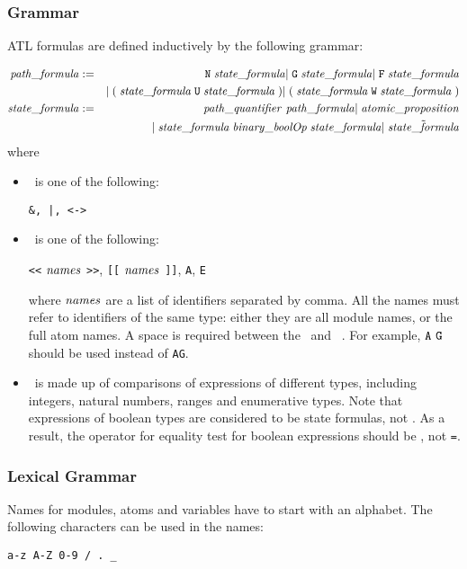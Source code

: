 \subsubsection{Grammar}
\label{sec:ATL-grammar}
ATL formulas are defined inductively by the following grammar:

\begin{eqnarray*}
{\it path\_formula} &:=& {\tt N}\;{\it state\_formula} 
                {\tt |}\; {\tt G}\; {\it state\_formula} 
                {\tt |}\; {\tt F}\; {\it state\_formula} \\
& &             {\tt |}\; {\tt (}\;{\it state\_formula}\;{\tt U}\;{\it state\_formula}\;{\tt )}
                {\tt |}\; {\tt (}\;{\it state\_formula}\;{\tt W}\;{\it state\_formula}\;{\tt )} \\
{\it state\_formula} &:=& {\it path\_quantifier}\ {\it path\_formula} 
                 {\tt |}\; {\it atomic\_proposition} \\
& &              {\tt |}\; {\it state\_formula}\;{\it binary\_boolOp}\;{\it state\_formula}
                 {\tt |}\; \tilde{{\it state\_formula}}
\end{eqnarray*}
where 
\begin{itemize}
\item
\binaryBoolOp\  is one of the following:
\begin{center}
\begin{verbatim}
&, |, <->
\end{verbatim}
\end{center}

\item
\pathQuantifier\  is one of the following:
\begin{center}
{\tt <<} ${\it names}$ {\tt >>}, {\tt [[} ${\it names}$ {\tt ]]}, {\tt A}, {\tt E}
\end{center}
where ${\it names}$ are a list of identifiers separated by comma. All the
names must refer to identifiers of the same type: either they
are all module names, or the full atom names.  A space is required 
between the \pathQuantifier\ and \pathFormula\ . For example, 
${\tt A}\ {\tt G}$ should be used instead of {\tt AG}.

\item
\atomicProp\ is made up of comparisons of expressions of different
types, including integers, natural numbers, ranges and enumerative
types. Note that expressions of boolean types are considered to be
state formulas, not \atomicProp. As a result, the operator for
equality test for boolean expressions should be {\tt <->}, not
{\tt =}.
\end{itemize}

\subsubsection{Lexical Grammar}
Names for modules, atoms and variables have to start with an
alphabet. 
The following characters can be used in the names:
\begin{center}
\begin{verbatim}
a-z A-Z 0-9 / . _ 
\end{verbatim}
\end{center}

